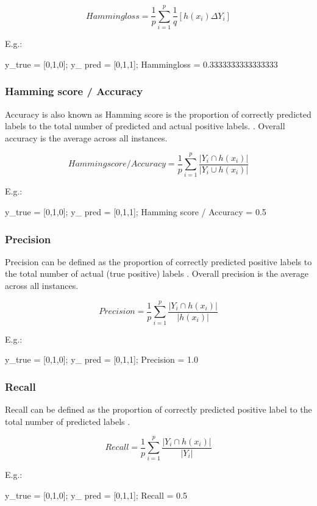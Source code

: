  $$Hammingloss = \frac{1}{p}\sum_{i =1}^{p}\frac{1}{q}[h(x_i) \Delta Y_i]$$ \cite{zhang2010multi}
 

E.g.: 

y\_true = [0,1,0]; 
y\_ pred = [0,1,1];  
Hammingloss = 0.3333333333333333


\subsubsection{Hamming score / Accuracy}

 Accuracy is also known as Hamming score is the proportion of correctly predicted labels to the total number of predicted and actual positive labels. \cite{sorower2010literature}.  Overall accuracy is the average across all instances.

$$Hamming score / Accuracy = \frac{1}{p}\sum_{i =1}^{p}\frac{|Y_i \cap h(x_i)|}{|Y_i \cup h(x_i)|}$$ \cite{zhang2010multi}


E.g.: 

y\_true = [0,1,0]; 
y\_ pred = [0,1,1];  
Hamming score / Accuracy = 0.5

\subsubsection{Precision}

Precision can be defined as the proportion of correctly predicted positive labels to the total number of actual (true positive)
labels \cite{sorower2010literature}. Overall precision is the average across all instances.

$$Precision = \frac{1}{p}\sum_{i =1}^{p}\frac{|Y_i \cap h(x_i)|}{|h(x_i)|}$$ \cite{zhang2010multi}

E.g.: 

y\_true = [0,1,0]; 
y\_ pred = [0,1,1];  
Precision = 1.0

\subsubsection{Recall}

Recall can be defined as the proportion of correctly predicted positive label to the total number of predicted labels \cite{sorower2010literature}.

$$Recall = \frac{1}{p}\sum_{i =1}^{p}\frac{|Y_i \cap h(x_i)|}{|Y_i|}$$ \cite{zhang2010multi}

E.g.: 

y\_true = [0,1,0]; 
y\_ pred = [0,1,1];  
Recall = 0.5

